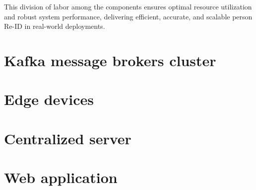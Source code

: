 \documentclass[../main.tex]{subfiles}
\begin{document}
This division of labor among the components ensures optimal resource utilization and robust system performance, delivering efficient, accurate, and scalable person Re-ID in real-world deployments.


\section{Kafka message brokers cluster}
\label{sec:kafka_cluster}



\section{Edge devices}
\label{sec:edge_devices}


\section{Centralized server}
\label{sec:centralized_server}


\section{Web application}
\end{document}
